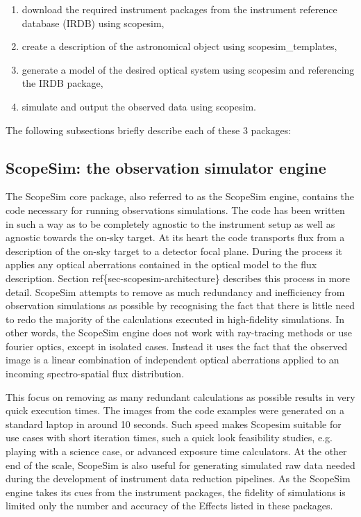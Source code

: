 \begin{enumerate}
\item download the required instrument packages from the instrument reference database (IRDB) using scopesim,

\item create a description of the astronomical object using scopesim\_templates,

\item generate a model of the desired optical system using scopesim and referencing the IRDB package,

\item simulate and output the observed data using scopesim.
\end{enumerate}

The following subsections briefly describe each of these 3 packages:


\subsection{ScopeSim: the observation simulator engine%
  \label{scopesim-the-observation-simulator-engine}%
}

The ScopeSim core package, also referred to as the ScopeSim engine, contains the code necessary for running observations simulations.
The code has been written in such a way as to be completely agnostic to the instrument setup as well as agnostic towards the on-sky target.
At its heart the code transports flux from a description of the on-sky target to a detector focal plane.
During the process it applies any optical aberrations contained in the optical model to the flux description.
Section ref\{sec-scopesim-architecture\} describes this process in more detail.
ScopeSim attempts to remove as much redundancy and inefficiency from observation simulations as possible by recognising the fact that there is little need to redo the majority of the calculations executed in high-fidelity simulations.
In other words, the ScopeSim engine does not work with ray-tracing methods or use fourier optics, except in isolated cases.
Instead it uses the fact that the observed image is a linear combination of independent optical aberrations applied to an incoming spectro-spatial flux distribution.

This focus on removing as many redundant calculations as possible results in very quick execution times.
The images from the code examples were generated on a standard laptop in around 10 seconds.
Such speed makes Scopesim suitable for use cases with short iteration times, such a quick look feasibility studies, e.g. \textquotedbl{}playing\textquotedbl{} with a science case, or advanced exposure time calculators.
At the other end of the scale, ScopeSim is also useful for generating simulated raw data needed during the development of instrument data reduction pipelines.
As the ScopeSim engine takes its cues from the instrument packages, the fidelity of simulations is limited only the number and accuracy of the Effects listed in these packages.


